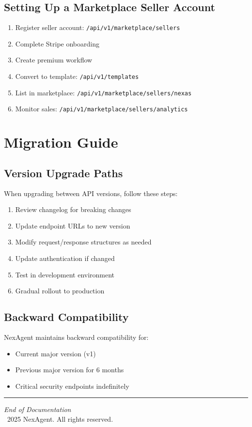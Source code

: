 \documentclass[11pt,a4paper]{report}
\begin{document}
\section{Setting Up a Marketplace Seller Account}

\begin{enumerate}[leftmargin=*]
    \item Register seller account: \texttt{/api/v1/marketplace/sellers}
    \item Complete Stripe onboarding
    \item Create premium workflow
    \item Convert to template: \texttt{/api/v1/templates}
    \item List in marketplace: \texttt{/api/v1/marketplace/sellers/nexas}
    \item Monitor sales: \texttt{/api/v1/marketplace/sellers/analytics}
\end{enumerate}

\chapter{Migration Guide}

\section{Version Upgrade Paths}

When upgrading between API versions, follow these steps:

\begin{enumerate}[leftmargin=*]
    \item Review changelog for breaking changes
    \item Update endpoint URLs to new version
    \item Modify request/response structures as needed
    \item Update authentication if changed
    \item Test in development environment
    \item Gradual rollout to production
\end{enumerate}

\section{Backward Compatibility}

NexAgent maintains backward compatibility for:
\begin{itemize}[leftmargin=*]
    \item Current major version (v1)
    \item Previous major version for 6 months
    \item Critical security endpoints indefinitely
\end{itemize}

\vfill
\begin{center}
\hrule
\vspace{0.5cm}
\textit{End of Documentation}\\
\textcopyright\ 2025 NexAgent. All rights reserved.
\end{center}
\end{document}
